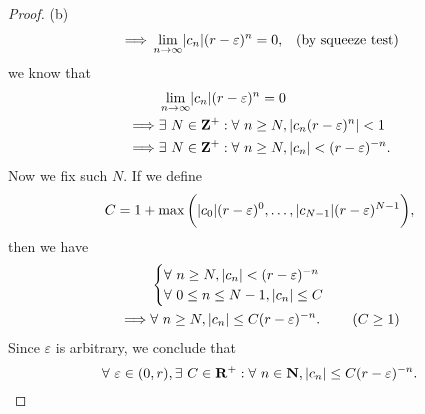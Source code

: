 \begin{proof}{(b)}
\begin{align*}
        \implies & \lim_{n \to \infty} \abs*{c_n} (r - \varepsilon)^n = 0,                                  & \text{(by squeeze test)}
    \end{align*}
    we know that
    \begin{align*}
                 & \lim_{n \to \infty} \abs*{c_n} (r - \varepsilon)^n = 0                                \\
        \implies & \exists\ N \in \mathbf{Z}^+ : \forall\ n \geq N, \abs*{c_n (r - \varepsilon)^n} < 1   \\
        \implies & \exists\ N \in \mathbf{Z}^+ : \forall\ n \geq N, \abs*{c_n} < (r - \varepsilon)^{-n}.
    \end{align*}
    Now we fix such \(N\).
    If we define
    \[
        C = 1 + \max\bigg(\abs*{c_0} (r - \varepsilon)^0, \dots, \abs*{c_{N - 1}} (r - \varepsilon)^{N - 1}\bigg),
    \]
    then we have
    \begin{align*}
                 & \begin{cases}
            \forall\ n \geq N, \abs*{c_n} < (r - \varepsilon)^{-n} \\
            \forall\ 0 \leq n \leq N - 1, \abs*{c_n} \leq C
        \end{cases}                                                \\
        \implies & \forall\ n \geq N, \abs*{c_n} \leq C (r - \varepsilon)^{-n}. & (C \geq 1)
    \end{align*}
    Since \(\varepsilon\) is arbitrary, we conclude that
    \[
        \forall\ \varepsilon \in (0, r), \exists\ C \in \mathbf{R}^+ : \forall\ n \in \mathbf{N}, \abs*{c_n} \leq C (r - \varepsilon)^{-n}.
    \]
\end{proof}

